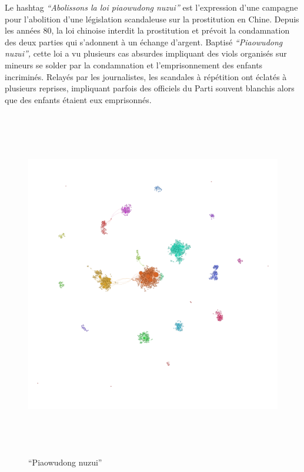 Le hashtag \textit{{\textquotedblleft}Abolissons la loi piaowudong nuzui{\textquotedblright} }est l{\textquoteright}expression d{\textquoteright}une campagne pour l{\textquoteright}abolition d{\textquoteright}une législation scandaleuse sur la prostitution en Chine. Depuis les années 80, la loi chinoise interdit la prostitution et prévoit la condamnation des deux parties qui s{\textquoteright}adonnent à un échange d{\textquoteright}argent. Baptisé \textit{{\textquotedblleft}Piaowudong nuzui{\textquotedblright}, }cette loi a vu plusieurs cas absurdes impliquant des viols organisés sur mineurs se solder par la condamnation et l{\textquoteright}emprisonnement des enfants incriminés. Relayés par les journalistes, les scandales à répétition ont éclatés à plusieurs reprises, impliquant parfois des officiels du Parti souvent blanchis alors que des enfants étaient eux emprisonnés. 

\begin{figure}[th]
    \centering
    \includegraphics[width=6.0114in,height=6.0114in]{figures/chap3/chapitre3-img19.png}
    \caption{ {\textquotedblleft}Piaowudong nuzui{\textquotedblright}}
    \label{fig:piaodong}
\end{figure}

